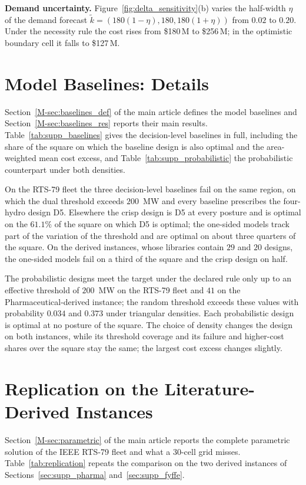 \documentclass[11pt]{article}
\begin{document}
\textbf{Demand uncertainty.} Figure~\ref{fig:delta_sensitivity}(b) varies the half-width $\eta$ of the
demand forecast $\tilde{k} = (180(1-\eta), 180, 180(1+\eta))$ from $0.02$ to $0.20$. Under the
necessity rule the cost rises from \$180\,M to \$256\,M; in the optimistic boundary cell it falls to
\$127\,M.


\section{Model Baselines: Details} \label{sec:supp_baselines}
Section~\ref*{M-sec:baselines_def} of the main article defines the model baselines and Section~\ref*{M-sec:baselines_res} reports their main results.
Table~\ref{tab:supp_baselines} gives the decision-level baselines in full, including the share of the
square on which the baseline design is also optimal and the area-weighted mean cost excess, and
Table~\ref{tab:supp_probabilistic} the probabilistic counterpart under both densities.

On the RTS-79 fleet the three decision-level baselines fail on the same region, on which the dual
threshold exceeds $200$~MW and every baseline prescribes the four-hydro design D5. Elsewhere the crisp
design is D5 at every posture and is optimal on the $61.1\%$ of the square on which D5 is optimal; the
one-sided models track part of the variation of the threshold and are optimal on about three quarters
of the square. On the derived instances, whose libraries contain $29$ and $20$ designs, the one-sided
models fail on a third of the square and the crisp design on half.

The probabilistic designs meet the target under the declared rule only up to an effective threshold of
$200$~MW on the RTS-79 fleet and $41$ on the Pharmaceutical-derived instance; the random threshold
exceeds these values with probability $0.034$ and $0.373$ under triangular densities. Each probabilistic
design is optimal at no posture of the square. The choice of density changes the design on both
instances, while its threshold coverage and its failure and higher-cost shares over the square stay the same; the largest cost excess changes slightly.



\section{Replication on the Literature-Derived Instances} \label{sec:supp_replication}
Section~\ref*{M-sec:parametric} of the main article reports the complete parametric solution of the IEEE RTS-79
fleet and what a $30$-cell grid misses. Table~\ref{tab:replication} repeats the comparison on the two derived
instances of Sections~\ref{sec:supp_pharma} and~\ref{sec:supp_fyffe}.
\end{document}
